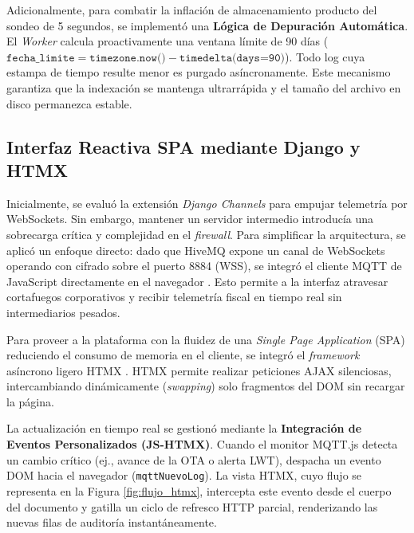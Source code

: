 \par Adicionalmente, para combatir la inflación de almacenamiento producto del sondeo de 5 segundos, se implementó una \textbf{Lógica de Depuración Automática}. El \textit{Worker} calcula proactivamente una ventana límite de 90 días ($\texttt{fecha\_limite} = \texttt{timezone.now()} - \texttt{timedelta(days=90)}$). Todo log cuya estampa de tiempo resulte menor es purgado asíncronamente. Este mecanismo garantiza que la indexación se mantenga ultrarrápida y el tamaño del archivo en disco permanezca estable.

\subsection{Interfaz Reactiva SPA mediante Django y HTMX}

\par Inicialmente, se evaluó la extensión \textit{Django Channels} para empujar telemetría por WebSockets. Sin embargo, mantener un servidor intermedio introducía una sobrecarga crítica y complejidad en el \textit{firewall}. Para simplificar la arquitectura, se aplicó un enfoque directo: dado que HiveMQ expone un canal de WebSockets operando con cifrado sobre el puerto 8884 (WSS), se integró el cliente MQTT de JavaScript directamente en el navegador \cite{OASIS_MQTT_v5}. Esto permite a la interfaz atravesar cortafuegos corporativos y recibir telemetría fiscal en tiempo real sin intermediarios pesados.\\

\par Para proveer a la plataforma con la fluidez de una \textit{Single Page Application} (SPA) reduciendo el consumo de memoria en el cliente, se integró el \textit{framework} asíncrono ligero HTMX \cite{HTMX_Doc}. HTMX permite realizar peticiones AJAX silenciosas, intercambiando dinámicamente (\textit{swapping}) solo fragmentos del DOM sin recargar la página.\\

\par La actualización en tiempo real se gestionó mediante la \textbf{Integración de Eventos Personalizados (JS-HTMX)}. Cuando el monitor MQTT.js detecta un cambio crítico (ej., avance de la OTA o alerta LWT), despacha un evento DOM hacia el navegador (\texttt{mqttNuevoLog}). La vista HTMX, cuyo flujo se representa en la Figura \ref{fig:flujo_htmx}, intercepta este evento desde el cuerpo del documento y gatilla un ciclo de refresco HTTP parcial, renderizando las nuevas filas de auditoría instantáneamente.\\

